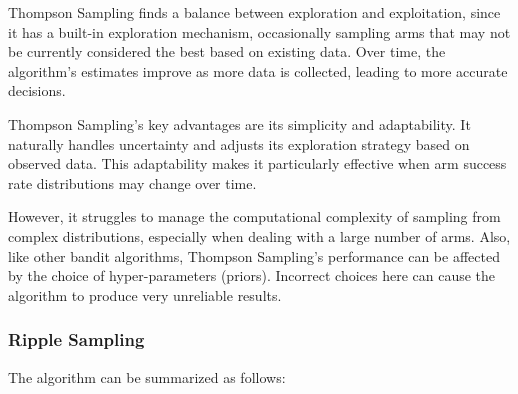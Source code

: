 

Thompson Sampling finds a balance between exploration and exploitation, since it has a built-in exploration mechanism, occasionally sampling arms that may not be currently considered the best based on existing data. Over time, the algorithm's estimates improve as more data is collected, leading to more accurate decisions.

Thompson Sampling's key advantages are its simplicity and adaptability. It naturally handles uncertainty and adjusts its exploration strategy based on observed data. This adaptability makes it particularly effective when arm success rate distributions may change over time.

However, it struggles to manage the computational complexity of sampling from complex distributions, especially when dealing with a large number of arms. Also, like other bandit algorithms, Thompson Sampling's performance can be affected by the choice of hyper-parameters (priors). Incorrect choices here can cause the algorithm to produce very unreliable results.



\subsubsection{Ripple Sampling}
\label{sec:ripple}


The algorithm can be summarized as follows:

